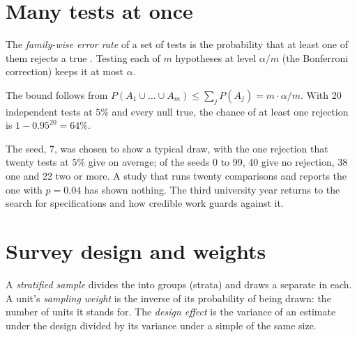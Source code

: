 \section{Many tests at once}\label{sec:b1:sampling-and-inference:many}

\begin{definition}\label{def:b1:sampling-and-inference:fwer}
The \emph{family-wise error rate} of a set of tests is the probability that at
least one of them rejects a true . Testing each of $m$
hypotheses at level $\alpha/m$ (the Bonferroni correction) keeps it at most $\alpha$.
\end{definition}

The bound follows from $P(A_1 \cup \dots \cup A_m) \le \sum_j P(A_j) = m \cdot \alpha/m$. With 20 independent tests at $5\%$
and every null true, the chance of at least one rejection is $1 - 0.95^{20} = 64\%$.

\label{lst:b1:sampling-and-inference:many}

\label{out:b1:sampling-and-inference:many}

The seed, 7, was chosen to show a typical draw, with the one rejection that
twenty tests at $5\%$ give on average; of the seeds 0 to 99, 40 give no
rejection, 38 one and 22 two or more.
A study that runs twenty comparisons and reports the one with $p = 0.04$ has
shown nothing. The third university year returns to the search for
specifications and how credible work guards against it.

\section{Survey design and weights}\label{sec:b1:sampling-and-inference:weights}

\begin{definition}\label{def:b1:sampling-and-inference:weights}
A \emph{stratified sample} divides the  into groups (strata) and
draws a separate  in each. A unit's \emph{sampling weight} is the
inverse of its probability of being drawn: the number of  units it
stands for. The \emph{design effect} is the variance of an estimate under the
design divided by its variance under a simple  of the same
size.
\end{definition}

